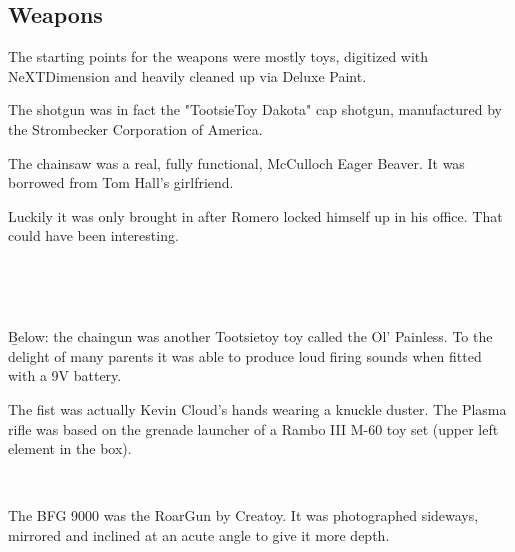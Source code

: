 \subsection{Weapons}
The starting points for the weapons were mostly toys, digitized with NeXTDimension and heavily cleaned up via Deluxe Paint.\\
\par
 The shotgun was in fact the "TootsieToy Dakota" cap shotgun, manufactured by the Strombecker Corporation of America.\\
\par
{}
\par
The chainsaw was a real, fully functional, McCulloch Eager Beaver. It was borrowed from Tom Hall's girlfriend.\\
\par
{}
\par
Luckily it was only brought in after Romero locked himself up in his office. That could have been interesting.\\
\par
{}\\
\par





\\
\par

\b{Below:} the chaingun was another Tootsietoy toy called the Ol' Painless. To the delight of many parents it was able to produce loud firing sounds when fitted with a 9V battery.

\par
{}

\vspace{-5mm}
The fist was actually Kevin Cloud's hands wearing a knuckle duster. The Plasma rifle was based on the grenade launcher of a Rambo III M-60 toy set (upper left element in the box).
\par
{}\\
\par
The BFG 9000 was the RoarGun by Creatoy. It was photographed sideways, mirrored and inclined at an acute angle to give it more depth.\\
\par
{}
\pagebreak


